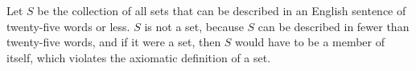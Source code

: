 Let $S$ be the collection of all sets that can be described in an English
sentence of twenty-five words or less. $S$ is not a set, because $S$ can be
described in fewer than twenty-five words, and if it were a set, then $S$ would
have to be a member of itself, which violates the axiomatic definition of a set.
